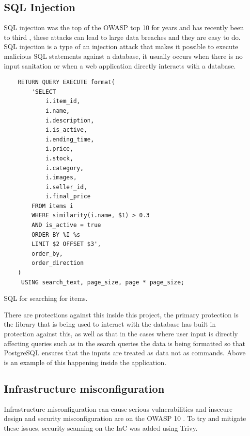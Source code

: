 \documentclass[]{project_report}
\begin{document}
\subsection{SQL Injection}
\label{subsection:sqlinjection}

SQL injection was the top of the OWASP top 10 for years and has recently been to third \cite{owasp_10}, these attacks can lead to large data breaches and they are easy to do. SQL injection is a type of an injection attack that makes it possible to execute malicious SQL statements against a database, it usually occurs when there is no input sanitation or when a web application directly interacts with a database.

\begin{codeblock}[H]
    \begin{verbatim}
    RETURN QUERY EXECUTE format(
        'SELECT
            i.item_id, 
            i.name, 
            i.description,
            i.is_active,
            i.ending_time,
            i.price,
            i.stock,
            i.category,
            i.images,
            i.seller_id,
            i.final_price
        FROM items i
        WHERE similarity(i.name, $1) > 0.3
        AND is_active = true
        ORDER BY %I %s
        LIMIT $2 OFFSET $3', 
        order_by,
        order_direction
    )
     USING search_text, page_size, page * page_size;
\end{verbatim}
    \caption{SQL for searching for items.}
    \label{code:itemSearchingSecurity}
\end{codeblock}

There are protections against this inside this project, the primary protection is the library that is being used to interact with the database has built in protection against this, as well as that in the cases where user input is directly affecting queries such as in the search queries the data is being formatted so that PostgreSQL ensures that the inputs are treated as data not as commands. Above is an example of this happening inside the application.

\subsection{Infrastructure misconfiguration}

Infrastructure misconfiguration can cause serious vulnerabilities and insecure design and security misconfiguration are on the OWASP 10 \cite{owasp_10}. To try and mitigate these issues, security scanning on the IaC was added using Trivy.
\end{document}
